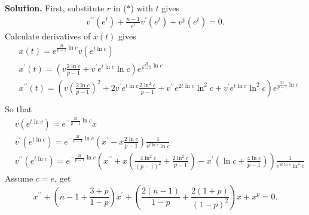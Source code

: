 \documentclass[a4paper]{book}
\newenvironment{solution}%
{\noindent\textbf{Solution.}}%
{\qedhere}
\numberwithin{equation}{chapter}
\theoremstyle{definition}
\begin{document}
\begin{solution}
  First, substitute $r$ in ($*$) with $t$ gives
  \begin{align*}
    v^{\prime\prime}(e^t) + \frac{n-1}{e^t}v^\prime(e^t) + v^p(e^t) = 0.
  \end{align*}
  Calculate derivatives of $x(t)$ gives
  \begin{align*}
    &x(t) = e^{\frac{2t}{p - 1}\ln c} v(e^{t\ln c}) \\
    &x^\prime(t) = (v\frac{2\ln c}{p-1} + v^\prime e^{t\ln c}\ln c )e^{\frac{2t}{p - 1}\ln c} \\
    &x^{\prime\prime}(t) = (v(\frac{2\ln c}{p-1})^2 + 2v^\prime e^{t\ln c}\frac{2\ln^2 c}{p-1} + v^{\prime\prime}e^{2t \ln c} \ln^2 c + v^\prime e^{t \ln c} \ln^2 c)e^{\frac{2t}{p - 1}\ln c} \\
  \end{align*}
  So that
  \begin{align*}
    &v(e^{t\ln c}) = e^{-\frac{2t}{p - 1}\ln c} x \\
    &v^\prime(e^{t \ln c}) = e^{-\frac{2t}{p - 1}\ln c}(x^\prime - x \frac{2\ln c}{p-1}) \frac{1}{e^{t \ln c}\ln c}\\
    &v^{\prime\prime}(e^{t \ln c}) = e^{-\frac{2t}{p - 1}\ln c}(x^{\prime\prime} + x(\frac{4 \ln^2 c}{(p-1)^2} + \frac{2 \ln^2 c}{p-1}) - x^\prime(\ln c + \frac{4 \ln c}{p-1})) \frac{1}{e^{2t\ln c}\ln^2 c}
  \end{align*}
  Assume $c = e$, get
  \[x^{\prime\prime} + (n - 1 + \frac{3 +p}{1 - p})x^\prime + (\frac{2(n-1)}{1-p} + \frac{2(1+p)}{(1-p)^2})x + x^p = 0.\]
\end{solution}






%   

%   

%   


\end{document}
